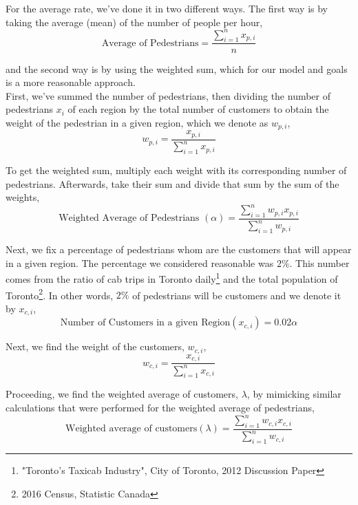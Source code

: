 \documentclass[Proceedings]{ascelike}
\begin{document}
For the average rate, we've done it in two different ways. The first way is by taking the average (mean) of the number of people per hour,
\begin{equation}
    \text{Average of Pedestrians} = \frac{\sum_{i=1}^n x_{p,i}}{n}
\end{equation}

and the second way is by using the weighted sum, which for our model and goals is a more reasonable approach. \\

First, we've summed the number of pedestrians, then dividing the number of pedestrians $x_i$ of each region by the total number of customers to obtain the weight of the pedestrian in a given region, which we denote as $w_{p,i}$,
\begin{equation}
    w_{p,i} = \frac{x_{p,i}}{\sum_{i=1}^n x_{p,i}}
\end{equation}

To get the weighted sum, multiply each weight with its corresponding number of pedestrians. Afterwards, take their sum and divide that sum by the sum of the weights,
\begin{equation}
    \text{Weighted Average of Pedestrians }(\alpha) = \frac{\sum_{i=1}^n w_{p,i}x_{p,i}}{\sum_{i=1}^n w_{p,i}}
\end{equation}

Next, we fix a percentage of pedestrians whom are the customers that will appear in a given region. The percentage we considered reasonable was $2\%$. This number comes from the ratio of cab trips in Toronto daily\footnote{"Toronto's Taxicab Industry", City of Toronto, 2012 Discussion Paper} and the total population of Toronto\footnote{2016 Census, Statistic Canada}. In other words, $2\%$ of pedestrians will be customers and we denote it by $x_{c,i}$,
\begin{equation}
    \text{Number of Customers in a given Region} (x_{c,i}) = 0.02\alpha
\end{equation}

Next, we find the weight of the customers, $w_{c,i}$,
\begin{equation}
    w_{c, i} = \frac{x_{c,i}}{\sum_{i=1}^n x_{c,i}}
\end{equation}

Proceeding, we find the weighted average of customers, $\lambda$, by mimicking similar calculations that were performed for the weighted average of pedestrians,
\begin{equation}
    \text{Weighted average of customers}(\lambda) = \frac{\sum_{i=1}^n w_{c,i}x_{c,i}}{\sum_{i=1}^n w_{c,i}}
\end{equation}
\end{document}
